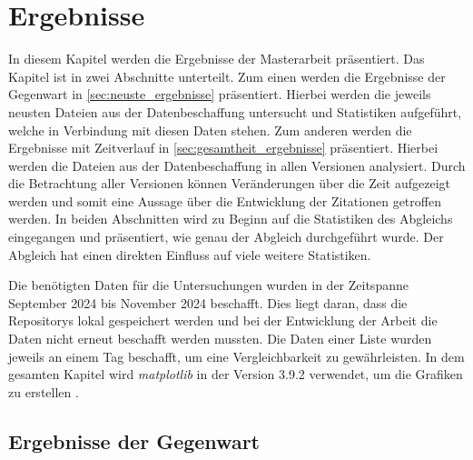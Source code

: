 \chapter{Ergebnisse}
\label{chap:ergebnisse}
In diesem Kapitel werden die Ergebnisse der Masterarbeit präsentiert.
Das Kapitel ist in zwei Abschnitte unterteilt.
Zum einen werden die Ergebnisse der Gegenwart in \autoref{sec:neuste_ergebnisse} präsentiert.
Hierbei werden die jeweils neusten Dateien aus der Datenbeschaffung untersucht und Statistiken aufgeführt, welche in Verbindung mit diesen Daten stehen.
Zum anderen werden die Ergebnisse mit Zeitverlauf in \autoref{sec:gesamtheit_ergebnisse} präsentiert.
Hierbei werden die Dateien aus der Datenbeschaffung in allen Versionen analysiert.
Durch die Betrachtung aller Versionen können Veränderungen über die Zeit aufgezeigt werden und somit eine Aussage über die Entwicklung der Zitationen getroffen werden.
In beiden Abschnitten wird zu Beginn auf die Statistiken des Abgleichs eingegangen und präsentiert, wie genau der Abgleich durchgeführt wurde.
Der Abgleich hat einen direkten Einfluss auf viele weitere Statistiken.

Die benötigten Daten für die Untersuchungen wurden in der Zeitspanne September 2024 bis November 2024 beschafft.
Dies liegt daran, dass die Repositorys lokal gespeichert werden und bei der Entwicklung der Arbeit die Daten nicht erneut beschafft werden mussten.
Die Daten einer Liste wurden jeweils an einem Tag beschafft, um eine Vergleichbarkeit zu gewährleisten.
In dem gesamten Kapitel wird \emph{matplotlib} in der Version 3.9.2 verwendet, um die Grafiken zu erstellen \autocite{hunter_matplotlib_2007}.

\section{Ergebnisse der Gegenwart}
\label{sec:neuste_ergebnisse}




